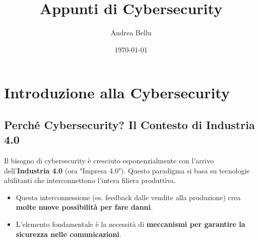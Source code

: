 \documentclass[a4paper,12pt]{article}
\title{Appunti di Cybersecurity}
\author{Andrea Bellu}
\date{\today}
\begin{document}
\maketitle

\section{Introduzione alla Cybersecurity}

\subsection{Perché Cybersecurity? Il Contesto di Industria 4.0}
Il bisogno di cybersecurity è cresciuto esponenzialmente con l'arrivo dell'\textbf{Industria 4.0} (ora "Impresa 4.0"). Questo paradigma si basa su tecnologie abilitanti che interconnettono l'intera filiera produttiva.
\begin{itemize}
    \item Questa interconnessione (es. feedback dalle vendite alla produzione) crea \textbf{molte nuove possibilità per fare danni}.
    \item L'elemento fondamentale è la necessità di \textbf{meccanismi per garantire la sicurezza nelle comunicazioni}.
\end{itemize}
\end{document}
